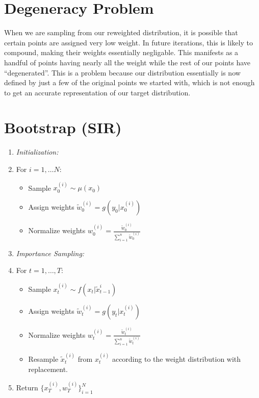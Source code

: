 \documentclass{article}
\begin{document}
\section{Degeneracy Problem}
When we are sampling from our reweighted distribution, it is possible that certain points are assigned very low weight. In future iterations, this is likely to compound, making their weights essentially negligable. This manifests as a handful of points having nearly all the weight while the rest of our points have ``degenerated''. This is a problem because our distribution essentially is now defined by just a few of the original points we started with, which is not enough to get an accurate representation of our target distribution. 


\section{Bootstrap (SIR)}
\begin{enumerate}
\item \textit{Initialization:}
\item[] For $i=1,\dots N$:
\begin{itemize}
\item[] Sample $x_0^{(i)} \sim \mu(x_0)$ 
\item[] Assign weights $\widetilde{w}_0^{(i)} = g(y_0|x_0^{(i)})$
\item[] Normalize weights $w_0^{(i)} = \frac{\widetilde{w}_0^{(i)}}{\sum_{i=1}^{n} \widetilde{w}_0^{(i)}}$
\end{itemize}
\item \textit{Importance Sampling:}
\item[] For $t=1,\dots,T$:
\begin{itemize}
\item[] Sample $x_t^{(i)} \sim f(x_t|\widetilde{x}_{t-1}^{i})$
\item[] Assign weights $\widetilde{w}_t^{(i)} = g(y_t|x_t^{(i)})$
\item[] Normalize weights $w_t^{(i)} = \frac{\widetilde{w}_t^{(i)}}{\sum_{i=1}^{n} \widetilde{w}_t^{(i)}}$
\item[] Resample $\widetilde{x}_t^{(i)}$ from $x_t^{(i)}$ according to the weight distribution with replacement.
\end{itemize}
\item Return $\{x_T^{(i)},w_T^{(i)}\}_{i=1}^N$
\end{enumerate}
\end{document}
